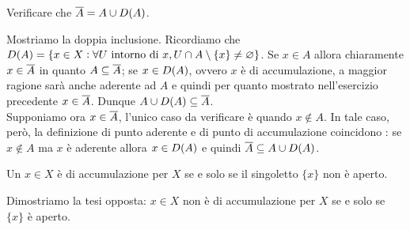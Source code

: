 \documentclass[a4paper]{article}\par \usepackage{style}\par
\begin{document}
\begin{es}
  Verificare che $ \overline{A} = A \cup D{(A)} $.
\end{es}\par Mostriamo la doppia inclusione. Ricordiamo che $ D{(A)} = \{x \in X : \forall U \text{ intorno di } x, U \cap A \setminus \{x\} \neq \varnothing\} $. Se $ x \in A $ allora chiaramente $ x \in \overline{A} $ in quanto $ A \subseteq \overline{A} $; se $ x \in D{(A)} $, ovvero $ x $ è di accumulazione, a maggior ragione sarà anche aderente ad $ A $ e quindi per quanto mostrato nell'esercizio precedente $ x \in \overline{A} $. Dunque $ A \cup D{(A)} \subseteq \overline{A} $. \\
Supponiamo ora $ x \in \overline{A} $, l'unico caso da verificare è quando $ x \notin A $. In tale caso, però, la definizione di punto aderente e di punto di accumulazione coincidono : se $ x \notin A $ ma $ x $ è aderente allora $ x \in D{(A)} $ e quindi $ \overline{A} \subseteq A \cup D{(A)} $.\par \begin{es}
  Un $ x \in X $ è di accumulazione per $ X $ se e solo se il singoletto $ \{x\} $ non è aperto.
\end{es}\par Dimostriamo la tesi opposta: $ x \in X $ non è di accumulazione per $ X $ se e solo se $ \{x\} $ è aperto. \\
\end{document}
